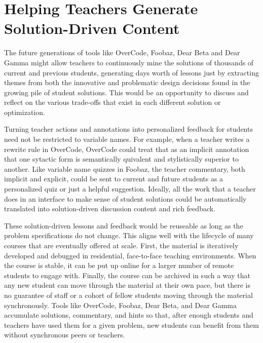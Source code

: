 \section{Helping Teachers Generate Solution-Driven Content}

The future generations of tools like OverCode, Foobaz, Dear Beta and Dear Gamma might allow teachers to continuously mine the solutions of thousands of current and previous students, generating days worth of lessons just by extracting themes from both the innovative and problematic design decisions found in the growing pile of student solutions. This would be an opportunity to discuss and reflect on the various trade-offs that exist in each different solution or optimization. 

Turning teacher actions and annotations into personalized feedback for students need not be restricted to variable names. For example, when a teacher writes a rewrite rule in OverCode, OverCode could treat that as an implicit annotation that one sytactic form is semantically quivalent and stylistically superior to another. Like variable name quizzes in Foobaz, the teacher commentary, both implicit and explicit, could be sent to current and future students as a personalized quiz or just a helpful suggestion. Ideally, all the work that a teacher does in an interface to make sense of student solutions could be automatically translated into solution-driven discussion content and rich feedback.

These solution-driven lessons and feedback would be reuseable as long as the problem specifications do not change. This aligns well with the lifecycle of many courses that are eventually offered at scale. First, the material is iteratively developed and debugged in residential, face-to-face teaching environments. When the course is stable, it can be put up online for a larger number of remote students to engage with. Finally, the course can be archived in such a way that any new student can move through the material at their own pace, but there is no guarantee of staff or a cohort of fellow students moving through the material synchronously. Tools like OverCode, Foobaz, Dear Beta, and Dear Gamma accumulate solutions, commentary, and hints so that, after enough students and teachers have used them for a given problem, new students can benefit from them without synchronous peers or teachers.



